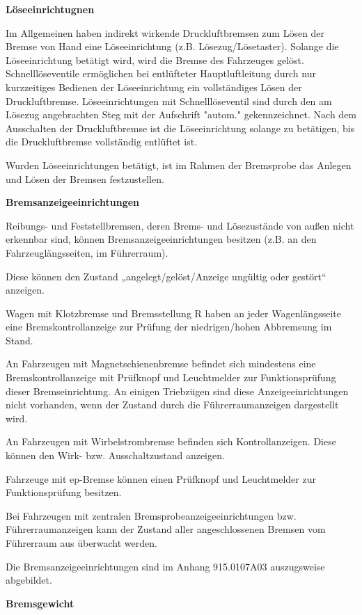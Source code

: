 \textbf{Löseeinrichtugnen}\par
Im Allgemeinen haben indirekt wirkende Druckluftbremsen zum Lösen der Bremse von Hand eine Löseeinrichtung (z.B. Lösezug/Lösetaster). Solange die Löseeinrichtung betätigt wird, wird die Bremse des Fahrzeuges gelöst. Schnelllöseventile ermöglichen bei entlüfteter Hauptluftleitung durch nur kurzzeitiges Bedienen der Löseeinrichtung ein vollständiges Lösen der Druckluftbremse. Löseeinrichtungen mit Schnelllöseventil sind durch den am Lösezug angebrachten Steg mit der Aufschrift "autom." gekennzeichnet. Nach dem Ausschalten der Druckluftbremse ist die Löseeinrichtung solange zu betätigen, bis die Druckluftbremse vollständig entlüftet ist.\par 
Wurden Löseeinrichtungen betätigt, ist im Rahmen der Bremsprobe das Anlegen und Lösen der Bremsen festzustellen.\par
\textbf{Bremsanzeigeeinrichtungen}\par
Reibungs- und Feststellbremsen, deren Brems- und Lösezustände von außen nicht erkennbar sind, können Bremsanzeigeeinrichtungen besitzen (z.B. an den Fahrzeuglängsseiten, im Führerraum).\par
Diese können den Zustand „angelegt/gelöst/Anzeige ungültig oder gestört“ anzeigen. \par
Wagen mit Klotzbremse und Bremsstellung R haben an jeder Wagenlängsseite eine Bremskontrollanzeige zur Prüfung der niedrigen/hohen Abbremsung im Stand.\par
An Fahrzeugen mit Magnetschienenbremse befindet sich mindestens eine Bremskontrollanzeige mit Prüfknopf und Leuchtmelder zur Funktionsprüfung dieser Bremseinrichtung. An einigen Triebzügen sind diese Anzeigeeinrichtungen nicht vorhanden, wenn der Zustand durch die Führerraumanzeigen dargestellt wird.\par 
An Fahrzeugen mit Wirbelstrombremse befinden sich Kontrollanzeigen. Diese können den Wirk- bzw. Ausschaltzustand anzeigen. \par
Fahrzeuge mit ep-Bremse können einen Prüfknopf und Leuchtmelder zur Funktionsprüfung besitzen. \par
Bei Fahrzeugen mit zentralen Bremsprobeanzeigeeinrichtungen bzw. Führerraumanzeigen kann der Zustand aller angeschlossenen Bremsen vom Führerraum aus überwacht werden.\par
Die Bremsanzeigeeinrichtungen sind im Anhang 915.0107A03 auszugsweise abgebildet.\par
\textbf{Bremsgewicht}\par
